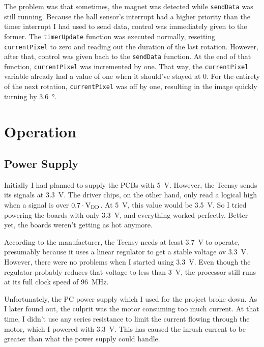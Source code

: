 \documentclass[a4paper, 11pt, titlepage]{report}
\def \vdd {V\textsubscript{DD}}
\begin{document}
The problem was that sometimes, the magnet was detected while \texttt{sendData} was still running.
Because the hall sensor's interrupt had a higher priority than the timer interrupt I had used to
send data, control was immediately given to the former. The \texttt{timerUpdate} function was
executed normally, resetting \texttt{currentPixel} to zero and reading out the duration of the last
rotation. However, after that, control was given bach to the \texttt{sendData} function. At the end
of that function, \texttt{currentPixel} was incremented by one. That way, the \texttt{currentPixel}
variable already had a value of one when it should've stayed at 0. For the entirety of the next
rotation, \texttt{currentPixel} was off by one, resulting in the image quickly turning by
\SI{3.6}{\degree}.




\chapter{Operation}

\section{Power Supply}

Initially I had planned to supply the PCBs with \SI{5}{\volt}. However, the Teensy sends its
signals at \SI{3.3}{\volt}. The driver chips, on the other hand, only read a logical high when a
signal is over $0.7 \cdot \textrm{\vdd}$. At \SI{5}{\volt}, this value would be \SI{3.5}{\volt}.
So I tried powering the boards with only \SI{3.3}{\volt}, and everything worked perfectly. Better
yet, the boards weren't getting as hot anymore.

According to the manufacturer, the Teensy needs at least \SI{3.7}{\volt} to operate, presumably
because it uses a linear regulator to get a stable voltage ov \SI{3.3}{\volt}. However, there were
no problems when I started using \SI{3.3}{\volt}. Even though the regulator probably reduces that
voltage to less than \SI{3}{\volt}, the processor still runs at its full clock speed of
\SI{96}{\mega\hertz}.

Unfortunately, the PC power supply which I used for the project broke down. As I later found out,
the culprit was the motor consuming too much current. At that time, I didn't use any series
resistance to limit the current flowing through the motor, which I powered with \SI{3.3}{\volt}.
This has caused the inrush current to be greater than what the power supply could handle.
\end{document}

